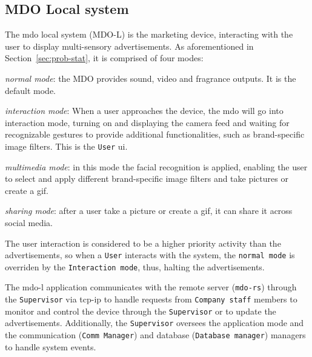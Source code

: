 \subsection{MDO Local system}
\label{sec:mdo-local-system}
The \gls{mdo} local system (MDO-L) is the marketing device, interacting with the user
to display multi-sensory advertisements. As aforementioned in
Section~\ref{sec:prob-stat}, it is comprised of four modes:
\begin{item-c}
\item \emph{normal mode}: the MDO provides sound, video and fragrance
  outputs. It is the default mode.
\item \emph{interaction mode}: When a user approaches the device, the \gls{mdo} will
go into interaction mode, turning on and displaying the camera feed and waiting
for recognizable gestures to provide additional functionalities, such as
brand-specific image filters. This is the \texttt{User} \gls{ui}.
\item \emph{multimedia mode}: in this mode the facial recognition is applied,
  enabling the user to select and apply different brand-specific image filters and take pictures or create a \gls{gif}.
\item \emph{sharing mode}: after a user take a picture or create a \gls{gif}, it
  can share it across social media.
\end{item-c}

The user interaction is considered to be a higher priority activity than the
advertisements, so when a \texttt{User} interacts with the system, the \texttt{normal
mode} is overriden by the \texttt{Interaction mode}, thus, halting the
advertisements.

The \gls{mdo-l} application communicates with the remote server
(\texttt{\gls{mdo-rs}}) through the \texttt{Supervisor} via \gls{tcp-ip}
 to handle requests from \texttt{Company staff} members
to monitor and control the device through the \texttt{Supervisor} or to update
the advertisements. Additionally, the \texttt{Supervisor} oversees the
application mode and the communication (\texttt{Comm Manager}) and database
(\texttt{Database manager}) managers to handle system events.
%

